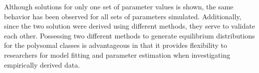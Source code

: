 \documentclass[review]{elsarticle}
\begin{document}
Although solutions for only one set of parameter values is shown, the same behavior has been observed for all sets of parameters simulated.
Additionally, since the two solution were derived using different methods, they serve to validate each other.
Possessing two different methods to generate equilibrium distributions for the polysomal classes is advantageous in that it provides flexibility to researchers for model fitting and parameter estimation when investigating empirically derived data.
%
%
%
%
%
%
%
%
%
%
%
\end{document}
